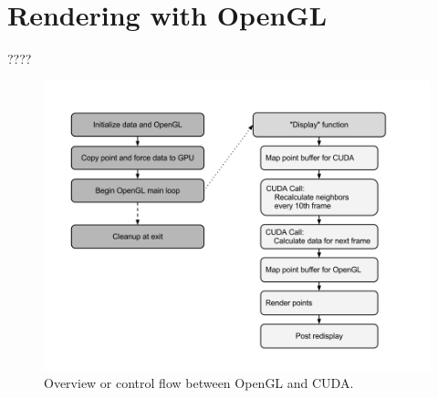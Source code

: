 \documentclass[cameraready]{acmsiggraph-awb}
\begin{document}
\section{Rendering with OpenGL}

????
\begin{figure}
\begin{centering}
\includegraphics[width = 5in]{Figures/openglFlowchart.png}
\caption{Overview or control flow between OpenGL and CUDA.}
\label{fig:kernelDivision}
\end{centering}
\end{figure}


%
%
%
%
\end{document}
